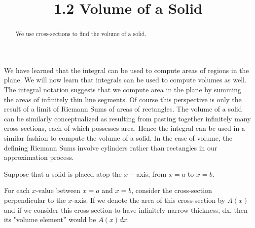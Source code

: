 \documentclass[handout]{ximera}
\title{1.2 Volume of a Solid}
\begin{document}
\begin{abstract}
We use cross-sections to find the volume of a solid.
\end{abstract}

\maketitle


We have learned that the integral can be used to compute areas of regions in the plane.  
We will now learn that integrals can be used to compute volumes as well.
The integral notation suggests that we compute area in the plane by summing the areas of  infinitely thin line segments.
Of course this perspective is only the result of a limit of Riemann Sums of areas of rectangles.
The volume of a solid can be similarly conceptualized as resulting from pasting together infinitely many cross-sections,
each of which possesses area. Hence the integral can be used in a similar fashion to compute the volume of a solid.
In the case of volume, the defining Riemann Sums involve cylinders rather than rectangles
in our approximation process.



Suppose that a solid is placed atop the $x-$axis, from $x = a$ to $x = b$.


For each $x$-value between $x = a$ and $x = b$,  consider the cross-section perpendicular to the $x$-axis. If we denote the area of this cross-section by 
 $A(x)$ and if we consider this cross-section to have infinitely narrow thickness, dx, then its "volume element'' would be $A(x) dx$.
\end{document}
